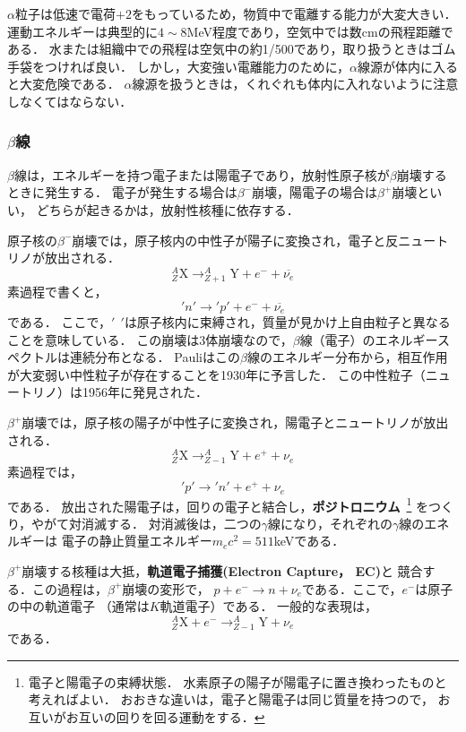\documentclass[a4j,10pt,oneside,openany]{jsbook}
\begin{document}
$\alpha$粒子は低速で電荷$+2$をもっているため，物質中で電離する能力が大変大きい．
運動エネルギーは典型的に$4\sim 8$MeV程度であり，空気中では数cmの飛程距離である．
水または組織中での飛程は空気中の約1/500であり，取り扱うときはゴム手袋をつければ良い．
しかし，大変強い電離能力のために，$\alpha$線源が体内に入ると大変危険である．
$\alpha$線源を扱うときは，くれぐれも体内に入れないように注意しなくてはならない．

\subsubsection{$\beta$線}

$\beta$線は，エネルギーを持つ電子または陽電子であり，放射性原子核が$\beta$崩壊するときに発生する．
電子が発生する場合は$\beta^-$崩壊，陽電子の場合は$\beta^+$崩壊といい，
どちらが起きるかは，放射性核種に依存する．

原子核の$\beta^-$崩壊では，原子核内の中性子が陽子に変換され，電子と反ニュートリノが放出される．
\begin{equation}
  ^A_Z\mbox{X}\to ^{A}_{Z+1}\mbox{Y} + e^- + \overline{\nu_e}
\end{equation}
素過程で書くと，
\begin{equation}
  'n' \to 'p' + e^- + \overline{\nu_e}
\end{equation}
である．
ここで，$'~~'$は原子核内に束縛され，質量が見かけ上自由粒子と異なることを意味している．
この崩壊は3体崩壊なので，$\beta$線（電子）のエネルギースペクトルは連続分布となる．
Pauliはこの$\beta$線のエネルギー分布から，相互作用が大変弱い中性粒子が存在することを1930年に予言した．
この中性粒子（ニュートリノ）は1956年に発見された．

$\beta^+$崩壊では，原子核の陽子が中性子に変換され，陽電子とニュートリノが放出される．
\begin{equation}
  ^A_Z\mbox{X} \to ^{A}_{Z-1}\mbox{Y} + e^+ + \nu_e
\end{equation}
素過程では，
\begin{equation}
  'p'\to 'n' + e^+ + \nu_e
\end{equation}
である．
放出された陽電子は，回りの電子と結合し，{\bf ポジトロニウム}~\footnote{
電子と陽電子の束縛状態．
水素原子の陽子が陽電子に置き換わったものと考えればよい．
おおきな違いは，電子と陽電子は同じ質量を持つので，
お互いがお互いの回りを回る運動をする．}
をつくり，やがて対消滅する．
対消滅後は，二つの$\gamma$線になり，それぞれの$\gamma$線のエネルギーは
電子の静止質量エネルギー$m_e c^2 = 511$keVである．

$\beta^+$崩壊する核種は大抵，{\bf 軌道電子捕獲(Electron Capture， EC)}と
競合する．この過程は，$\beta^+$崩壊の変形で，
$p + e^- \to n + \nu_e$である．ここで，$e^-$は原子の中の軌道電子
（通常は$K$軌道電子）である．
一般的な表現は，
\begin{equation}
  ^A_Z\mbox{X} +e^- \to ^{A}_{Z-1}\mbox{Y} + \nu_e
\end{equation}
である．
\end{document}
